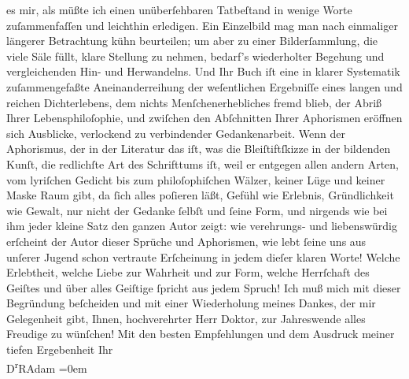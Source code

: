 \begin{ledgroupsized}[t]{13cm}
                    es mir, als müßte ich einen unüberſehbaren Tatbeſtand in wenige Worte
                    zuſammenfaſſen und leichthin erledigen. Ein Einzelbild mag man nach einmaliger
                    längerer Betrachtung {\pb}kühn
                    beurteilen; um aber zu einer Bilderſammlung, die viele Säle füllt, klare
                    Stellung zu nehmen, bedarf’s wiederholter Begehung und vergleichenden Hin- und
                    Herwandelns. Und Ihr Buch iſt eine in klarer Systematik zuſammengefaßte
                    Aneinanderreihung der weſentlichen Ergebniſſe eines langen und reichen
                    Dichterlebens, dem nichts Menſchenerhebliches fremd blieb, der Abriß Ihrer
                    Lebensphiloſophie, und zwiſchen den Abſchnitten Ihrer Aphorismen eröffnen sich
                    Ausblicke, verlockend zu verbindender Gedankenarbeit. Wenn der Aphorismus, der
                    in der Literatur das iſt, was die Bleiſtiftſkizze in der bildenden Kunſt, die
                    redlichſte Art des Schrifttums iſt, weil er entgegen allen andern Arten, vom
                    lyriſchen Gedicht bis zum philoſophiſchen Wälzer, keiner Lüge und keiner Maske
                    Raum  gibt, {\pb}da ſich alles poſieren läßt, Gefühl
                    wie Erlebnis, Gründlichkeit wie Gewalt, nur nicht der Gedanke ſelbſt und ſeine
                    Form, und nirgends wie bei ihm jeder kleine Satz den ganzen Autor zeigt: wie
                    verehrungs- und liebenswürdig erſcheint der Autor dieser Sprüche und Aphorismen,
                    wie lebt ſeine uns aus unſerer Jugend schon vertraute Erſcheinung in jedem
                    dieſer klaren Worte! Welche Erlebtheit, welche Liebe zur Wahrheit und zur Form,
                    welche Herrſchaft des Geiſtes und über alles Geiſtige ſpricht aus jedem
                    Spruch!\pend
           \pstart
           Ich muß mich mit dieser Begründung beſcheiden und mit einer Wiederholung meines
                    Dankes, der mir Gelegenheit gibt, Ihnen, hochverehrter Herr Doktor, zur
                    Jahreswende alles Freudige zu wünſchen!\pend
           \pstart
           Mit den besten Empfehlungen und {\pb}dem
                    Ausdruck meiner tiefen Ergebenheit\pend
           \pstart
           Ihr{\\[\baselineskip]}\spacefill\mbox{D\textsuperscript{r}RAdam}\pend
           \leftskip=0em{}\endnumbering{}\end{ledgroupsized}  \newcommand{\dateiname}{L02497}\newcommand{\titel}{Robert Adam an Arthur Schnitzler, 30. 12. 1927}\newcommand{\editorInnen}{Martin Anton Müller und Gerd-Hermann Susen}
      